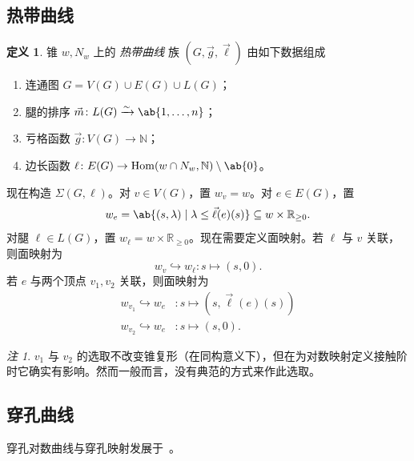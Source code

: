 \documentclass{amsart}
\theoremstyle{definition}
\newtheorem{defn}[thm]{定义}
\theoremstyle{remark}
\newtheorem{rmk}[thm]{注}
\theoremstyle{plain}
\theoremstyle{definition}
\theoremstyle{remark}
\newcommand{\N}{\mathbb{N}}
\newcommand{\R}{\mathbb{R}}
\newcommand{\1}{\mathbf{1}}
\newcommand{\2}{\mathbf{2}}
\newcommand{\3}{\mathbf{3}}
\DeclareMathOperator{\Hom}{Hom}
\begin{document}
\subsection{热带曲线}%
\label{sub:Tropical curves}

\begin{defn}
    锥 \(w, N_w\) 上的 \textit{热带曲线} 族 \((G, \vec{g}, \vec{\ell})\) 由如下数据组成
    \begin{enumerate}
        \item 连通图 \(G = V(G) \cup E(G) \cup L(G)\)；
        \item 腿的排序 \(\vec{m} \colon L(G) \xrightarrow{\sim} \ab\{1, \ldots, n\}\)；
        \item 亏格函数 \(\vec{g} \colon V(G) \to \N\)；
        \item 边长函数 \(\ell \colon E(G) \to \Hom(w \cap N_w, \N) \setminus \ab\{0\}\)。
    \end{enumerate}
\end{defn}

现在构造 \(\Sigma(G, \ell)\)。对 \(v \in V(G)\)，置 \(w_v = w\)。对 \(e \in E(G)\)，置
\[ w_e = \ab\{ (s, \lambda) \mid \lambda \leq \vec{\ell}(e)(s) \} \subseteq w \times \R_{\geq 0}. \]
对腿 \(\ell \in L(G)\)，置 \(w_{\ell} = w \times \R_{\geq 0}\)。现在需要定义面映射。若 \(\ell\) 与 \(v\) 关联，则面映射为
\[ w_v \hookrightarrow w_{\ell} \colon s \mapsto (s, 0). \]
若 \(e\) 与两个顶点 \(v_1, v_2\) 关联，则面映射为
\begin{align*}
    w_{v_1} \hookrightarrow w_e &\colon s \mapsto (s, \vec{\ell}(e)(s)) \\
    w_{v_2} \hookrightarrow w_e & \colon s \mapsto (s, 0).
\end{align*}
\begin{rmk}
    \(v_1\) 与 \(v_2\) 的选取不改变锥复形（在同构意义下），但在为对数映射定义接触阶时它确实有影响。然而一般而言，没有典范的方式来作此选取。
\end{rmk}

\subsection{穿孔曲线}%
\label{sub:Punctured curves}

穿孔对数曲线与穿孔映射发展于~\cite{ACGS2025}。
\end{document}
